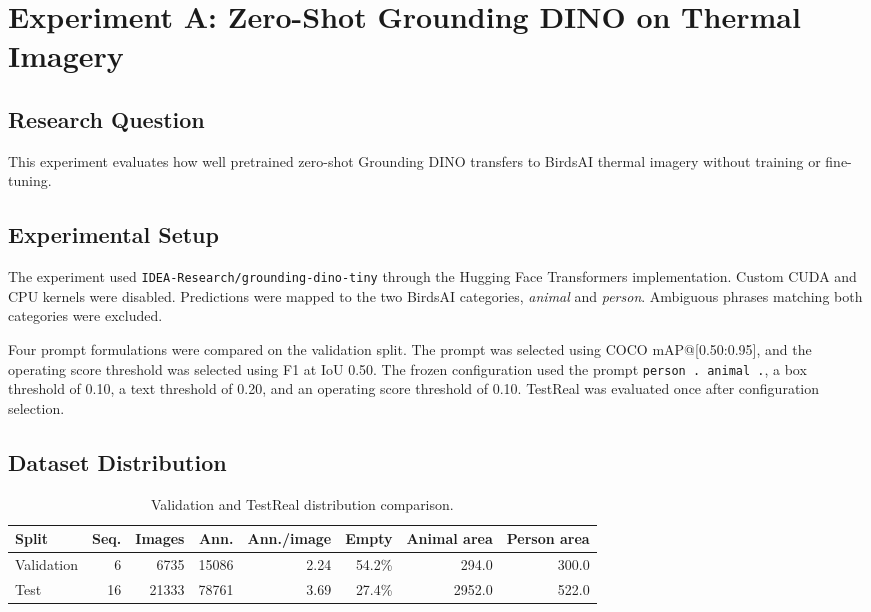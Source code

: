 \providecommand{\ExperimentAFigureRoot}{representative_examples}

\section{Experiment A: Zero-Shot Grounding DINO on Thermal Imagery}
\label{sec:experiment-a}

\subsection{Research Question}

This experiment evaluates how well pretrained zero-shot Grounding DINO transfers to BirdsAI thermal imagery without training or fine-tuning.

\subsection{Experimental Setup}

The experiment used \texttt{IDEA-Research/grounding-dino-tiny} through the Hugging Face Transformers implementation. Custom CUDA and CPU kernels were disabled. Predictions were mapped to the two BirdsAI categories, \emph{animal} and \emph{person}. Ambiguous phrases matching both categories were excluded.

Four prompt formulations were compared on the validation split. The prompt was selected using COCO mAP@[0.50:0.95], and the operating score threshold was selected using F1 at IoU 0.50. The frozen configuration used the prompt \texttt{person . animal .}, a box threshold of 0.10, a text threshold of 0.20, and an operating score threshold of 0.10. TestReal was evaluated once after configuration selection.

\subsection{Dataset Distribution}

\begin{table}[htbp]
\centering
\caption{Validation and TestReal distribution comparison.}
\label{tab:experiment-a-distribution}
\small
\begin{tabular}{lrrrrrrr}
\hline
Split & Seq. & Images & Ann. & Ann./image & Empty & Animal area & Person area \\
\hline
Validation & 6 & 6735 & 15086 & 2.24 & 54.2\% & 294.0 & 300.0 \\
Test & 16 & 21333 & 78761 & 3.69 & 27.4\% & 2952.0 & 522.0 \\
\hline
\end{tabular}
\end{table}

